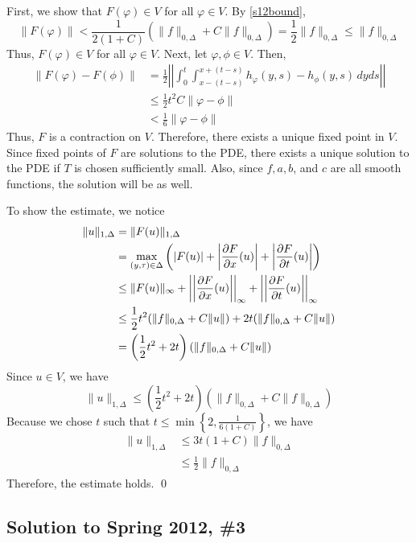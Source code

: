 \vspace{0.2cm}

First, we show that $F(\varphi) \in V$ for all $\varphi \in V$. By \eqref{s12bound},
$$\|F(\varphi)\| < \frac{1}{2(1+C)} (\|f\|_{0,\Delta} + C \|f\|_{0,\Delta}) = \frac{1}{2} \|f\|_{0,\Delta} \leq \|f\|_{0,\Delta} $$
Thus, $F(\varphi) \in V$ for all $\varphi \in V$. Next, let $\varphi, \phi \in V$. Then,
\begin{align*}
	\|F(\varphi) - F(\phi)\| &= \frac{1}{2} \left| \left| \int_0^t \int_{x-(t-s)}^{x+(t-s)} h_{\varphi}(y,s) - h_{\phi}(y,s) \, dy ds \right| \right|  \\
	&\leq \frac{1}{2} t^2 C \| \varphi - \phi\| \\
	&< \frac{1}{6} \|\varphi-\phi\|
\end{align*}
Thus, $F$ is a contraction on $V$. Therefore, there exists a unique fixed point in $V$. Since fixed points of $F$ are solutions to the PDE, there exists a unique solution to the PDE if $T$ is chosen sufficiently small. Also, since $f, a, b$, and $c$ are all smooth functions, the solution will be as well.

\vspace{0.4cm}

To show the estimate, we notice
\begin{align*}
	\|u\|_{1,\Delta} &= \|F(u)\|_{1,\Delta} \\
	&= \max_{(y,\tau) \in \Delta} \left( |F(u)| + \left| \frac{\partial F}{\partial x}(u) \right| + \left| \frac{\partial F}{\partial t}(u) \right| \right) \\
	&\leq \|F(u)\|_{\infty} + \left| \left| \frac{\partial F}{\partial x}(u) \right| \right|_{\infty} + \left| \left| \frac{\partial F}{\partial t}(u) \right| \right|_{\infty} \\
	&\leq \frac{1}{2} t^2 (\|f\|_{0,\Delta} + C \|u\| ) + 2t (\|f\|_{0,\Delta} + C \|u\|) \\
	&= \left( \frac{1}{2} t^2 + 2t \right) (\|f\|_{0,\Delta} + C\|u\|)
\end{align*}
Since $u \in V$, we have
$$ \|u\|_{1,\Delta} \leq \left( \frac{1}{2} t^2 + 2t \right) (\|f\|_{0,\Delta} + C\|f\|_{0,\Delta}) $$
Because we chose $t$ such that $t \leq \min \left\{ 2, \frac{1}{6(1+C)} \right\}$, we have
\begin{align*}
\|u\|_{1,\Delta} &\leq 3t (1+C)\|f\|_{0,\Delta}\\
&\leq \frac{1}{2} \|f\|_{0,\Delta}
\end{align*}
Therefore, the estimate holds.
\hfill\qed

\subsection*{Solution to Spring 2012, \#3}\label{s123}
